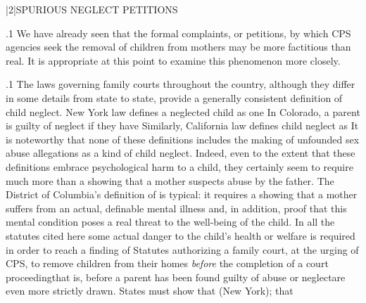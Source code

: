 \documentclass[11pt, twoside]{article}
\begin{document}
{\s|2|{SPURIOUS NEGLECT PETITIONS}

\p.1{%
\noindent{}We have already seen that the formal complaints, or petitions, by which
CPS agencies seek the removal of children from mothers may be more
factitious than real. It is appropriate at this point to examine this
phenomenon more closely.
}%

\p.1{%
The laws governing family courts throughout the country, although
they differ in some details from state to state, provide a generally consistent definition of child neglect. New York law defines a neglected child as
one  In Colorado, a parent is guilty of neglect
if they have  Similarly, California law defines child neglect as 
It is noteworthy that none of these definitions includes the making
of unfounded sex abuse allegations as a kind of child neglect. Indeed,
even to the extent that these definitions embrace psychological harm
to a child, they certainly seem to require much more than a showing
that a mother suspects abuse by the father. The District of Columbia's
definition of  is typical: it requires a showing that
a mother suffers from an actual, definable mental illness and, in addition,
proof that this mental condition poses a real threat to the well-being of
the child. In all the statutes cited here some actual danger to the child's
health or welfare is required in order to reach a finding of 
Statutes authorizing a family court, at the urging of CPS, to remove children from their homes \textit{before} the completion of a court
proceeding\mdash{}that is, before a parent has been found guilty of abuse or
neglect\mdash{}are even more strictly drawn. States must show that  (New
York); that }}
\end{document}

